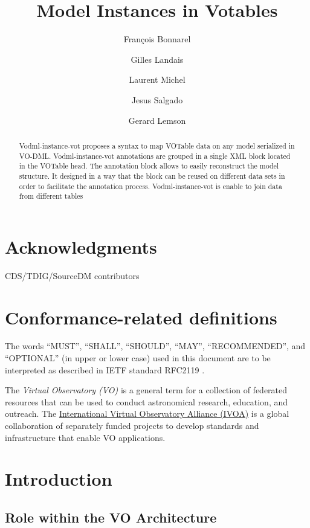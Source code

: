 \documentclass[11pt,a4paper]{ivoa}
\title{Model Instances in Votables}
\author{François Bonnarel}
\author{Gilles Landais}
\author{Laurent Michel}
\author{Jesus Salgado}
\author{Gerard Lemson}
\begin{document}
\begin{abstract}
Vodml-instance-vot proposes a syntax to map VOTable data on any model serialized in VO-DML.
Vodml-instance-vot annotations are grouped in a single XML block located in the VOTable head. The annotation block allows to easily reconstruct the model structure. It designed in a way that the block can be reused on different data sets in order to facilitate the annotation process.
Vodml-instance-vot is enable to join data from different tables
\end{abstract}


\section*{Acknowledgments}
CDS/TDIG/SourceDM contributors

\section*{Conformance-related definitions}

The words ``MUST'', ``SHALL'', ``SHOULD'', ``MAY'', ``RECOMMENDED'', and
``OPTIONAL'' (in upper or lower case) used in this document are to be
interpreted as described in IETF standard RFC2119 \citep{std:RFC2119}.

The \emph{Virtual Observatory (VO)} is a
general term for a collection of federated resources that can be used
to conduct astronomical research, education, and outreach.
The \href{http://www.ivoa.net}{International
Virtual Observatory Alliance (IVOA)} is a global
collaboration of separately funded projects to develop standards and
infrastructure that enable VO applications.

\pagebreak
\section{Introduction}



\subsection{Role within the VO Architecture}
\end{document}
